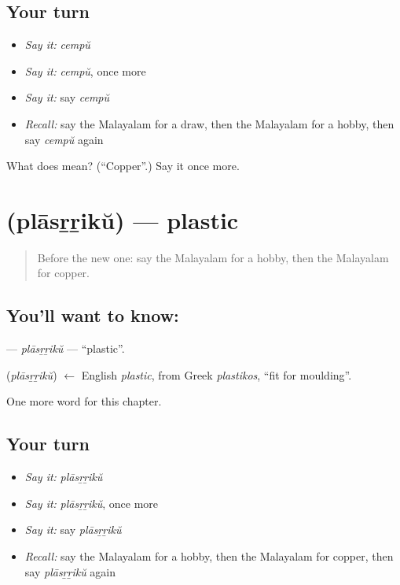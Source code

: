 \subsection*{Your turn}
\begin{itemize}
\raggedright
  \item \emph{Say it:} \emph{cempŭ}
  \item \emph{Say it:} \emph{cempŭ}, once more
  \item \emph{Say it:} say \emph{cempŭ}
  \item \emph{Recall:} say the Malayalam for a draw, then the Malayalam for a hobby, then say \emph{cempŭ} again
\end{itemize}

\begin{tcolorbox}[breakable,colback=teal!4,colframe=teal!35!black,title={Before you move on}]
What does  mean? (\textquotedblleft{}Copper\textquotedblright{}.) Say it once more.
\end{tcolorbox}
\section[\texorpdfstring{\ml{പ്ലാസ്റ്റിക്} (plāsṟṟikŭ)}{പ്ലാസ്റ്റിക് (plāsṟṟikŭ)}]{ (plāsṟṟikŭ) — plastic}

\label{lesson:ML-C216-plasrriku}



\begin{quote}
Before the new one: say the Malayalam for a hobby, then the Malayalam for copper.
\end{quote}

\subsection*{You'll want to know: }
\textbf{} — \emph{plāsṟṟikŭ} — \textquotedblleft{}plastic\textquotedblright{}.

\begin{cousinweb}
\textbf{} (\emph{plāsṟṟikŭ}) $\leftarrow$ English \emph{plastic}, from Greek \emph{plastikos}, \textquotedblleft{}fit for moulding\textquotedblright{}.
\end{cousinweb}

\begin{grammarlens}[title={What you've built}]
One more word for this chapter.
\end{grammarlens}

\subsection*{Your turn}
\begin{itemize}
\raggedright
  \item \emph{Say it:} \emph{plāsṟṟikŭ}
  \item \emph{Say it:} \emph{plāsṟṟikŭ}, once more
  \item \emph{Say it:} say \emph{plāsṟṟikŭ}
  \item \emph{Recall:} say the Malayalam for a hobby, then the Malayalam for copper, then say \emph{plāsṟṟikŭ} again
\end{itemize}

